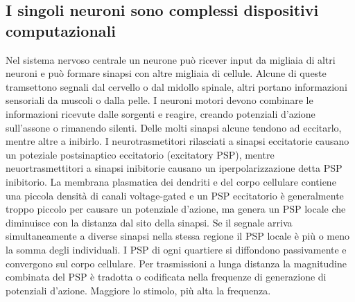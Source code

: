 \subsection{I singoli neuroni sono complessi dispositivi computazionali}
Nel sistema nervoso centrale un neurone pu\`o ricever input da migliaia di altri neuroni e pu\`o formare sinapsi con altre migliaia di cellule. Alcune di queste tramsettono segnali 
dal cervello o dal midollo spinale, altri portano informazioni sensoriali da muscoli o dalla pelle. I neuroni motori devono combinare le informazioni ricevute dalle sorgenti e 
reagire, creando potenziali d'azione sull'assone o rimanendo silenti. Delle molti sinapsi alcune tendono ad eccitarlo, mentre altre a inibirlo. I neurotrasmetitori rilasciati a
sinapsi eccitatorie causano un poteziale postsinaptico eccitatorio (excitatory PSP), mentre neuortrasmettitori a sinapsi inibitorie causano un iperpolarizzazione detta PSP inibitorio.
La membrana plasmatica dei dendriti e del corpo cellulare contiene una piccola densit\`a di canali  voltage-gated e un PSP eccitatorio \`e generalmente troppo piccolo per 
causare un potenziale d'azione, ma genera un PSP locale che diminuisce con la distanza dal sito della sinapsi. Se il segnale arriva simultaneamente a diverse sinapsi nella stessa 
regione il PSP locale \`e pi\`u o meno la somma degli individuali. I PSP di ogni quartiere si diffondono passivamente e convergono sul corpo cellulare. Per trasmissioni a lunga 
distanza la magnitudine combinata del PSP \`e tradotta o codificata nella frequenze di generazione di potenziali d'azione. Maggiore lo stimolo, pi\`u alta la frequenza. 
